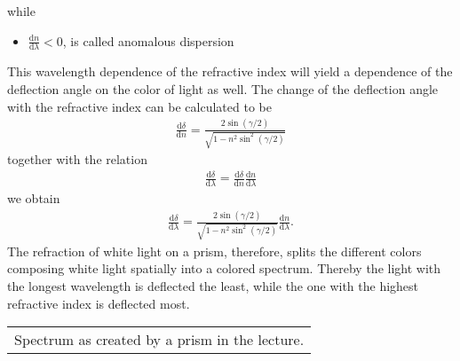 \documentclass[letterpaper,10pt,english]{sphinxmanual}
\begin{document}
while
\begin{itemize}
\item {} 
\(\frac{\mathrm dn}{\mathrm d\lambda}<0\), is called anomalous dispersion

\end{itemize}

This wavelength dependence of the refractive index will yield a dependence of the deflection angle on the color of light as well. The change of the deflection angle with the refractive index can be calculated to be
\begin{equation*}
\begin{split}\frac{\mathrm d\delta}{\mathrm d n}=\frac{2\sin(\gamma/2)}{\sqrt{1-n^2\sin^2(\gamma/2)}}\end{split}
\end{equation*}
together with the relation
\begin{equation*}
\begin{split}\frac{\mathrm d \delta}{\mathrm d \lambda}=\frac{\mathrm d\delta}{\mathrm d n}\frac{\mathrm d n}{\mathrm d\lambda}\end{split}
\end{equation*}
we obtain
\begin{equation*}
\begin{split}\frac{\mathrm d\delta}{\mathrm d\lambda}=\frac{2\sin(\gamma/2)}{\sqrt{1-n^2\sin^2(\gamma/2)}}\frac{\mathrm d n}{\mathrm d \lambda}.\end{split}
\end{equation*}
The refraction of white light on a prism, therefore, splits the different colors composing white light spatially into a colored spectrum. Thereby the light with the longest wavelength is deflected the least, while the one with the highest refractive index is deflected most.




\begin{savenotes}\sphinxattablestart
\centering
\begin{tabulary}{\linewidth}[t]{|T|}
\hline
\sphinxstyletheadfamily 
{}
\\
\hline
{} Spectrum as created by a prism in the lecture.
\\
\hline
\end{tabulary}
\par
\sphinxattableend\end{savenotes}
\end{document}
